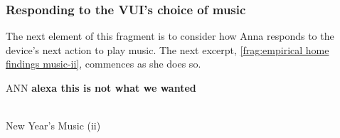 


\subsubsection{Responding to the VUI's choice of music}\label{sec:empirical home findings music responding}
\begin{revisedsubmission}
The next element of this fragment is to consider how Anna responds to the device's next action to play  music.
The next excerpt, \autoref{frag:empirical home findings music-ii}, commences as she does so.
\end{revisedsubmission}

\newpage
\begin{inlinefrag}
    {
    \begin{transcript}[12]
        \by ANN {\textbf{alexa this is not what we wanted}} \\
        \by     {[ ((laughs))~~~~~~~~~~~~~]} \\
    \end{transcript}
    \caption{New Year's Music (ii)}\label{frag:empirical home findings music-ii}
    }
\end{inlinefrag}

